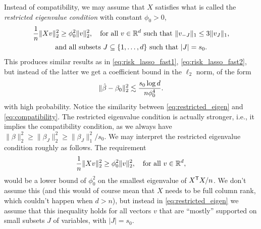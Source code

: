 \documentclass{article}
\begin{document}
Instead of compatibility, we may assume that $X$ satisfies what is called the
\emph{restricted eigenvalue condition} with constant $\phi_0>0$, 
\begin{equation}
\begin{gathered}
\label{eq:restricted_eigen}
\frac{1}{n}\|Xv\|_2^2 \geq \phi_0^2 \|v\|_2^2, \quad
\text{for all $v \in \mathbb{R}^d$ such that $\|v_{-J}\|_1 \leq 3 \|v_{J}\|_1$}, \\   
\text{and all subsets $J \subseteq \{1,\dots,d\}$ such that $|J|=s_0$}.   
\end{gathered}
\end{equation}  
This produces similar results as in \eqref{eq:risk_lasso_fast1},
\eqref{eq:risk_lasso_fast2}, but instead of the latter we get a coefficient
bound in the $\ell_2$ norm, of the form
\[
\|\hat{\beta}-\beta_0\|_2^2 \lesssim \frac{s_0 \log d}{n \phi_0^4}. 
\]
with high probability. Notice the similarity between \eqref{eq:restricted_eigen} 
and \eqref{eq:compatibility}. The restricted eigenvalue condition is actually
stronger, i.e., it implies the compatibility condition, as we always have
$\|\beta\|_2^2 \geq \|\beta_J\|_2^2 \geq \|\beta_J \|_1^2/s_0$. We may interpret
the restricted eigenvalue condition roughly as follows. The requirement
\[
\frac{1}{n} \|Xv\|_2^2 \geq \phi_0^2 \|v\|_2^2, \quad \text{for all $v \in
  \mathbb{R}^d$},
\]
would be a lower bound of $\phi_0^2$ on the smallest eigenvalue of $X^{\mathsf{T}} X/n$.
We don't assume this (and this would of course mean that $X$ needs to be full
column rank, which couldn't happen when $d>n$), but instead in
\eqref{eq:restricted_eigen} we assume that this inequality holds for all vectors
$v$ that are ``mostly'' supported on small subsets $J$ of variables, with
$|J|=s_0$.    



\end{document}
